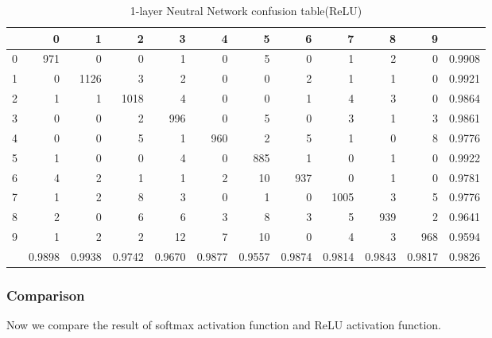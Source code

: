 \documentclass[conference]{IEEEtran}
\begin{document}
\begin{table}[htbp]
\tiny
  \centering
  \caption{1-layer Neutral Network confusion table(ReLU)}
\begin{tabular}{|r|rrrrrrrrrr|r|}
\hline
  & 0 & 1 & 2 & 3 & 4 & 5 & 6 & 7 & 8 & 9 &  \\
\hline
0 & 971 & 0 & 0 & 1 & 0 & 5 & 0 & 1 & 2 & 0 & 0.9908 \\
1 & 0 & 1126 & 3 & 2 & 0 & 0 & 2 & 1 & 1 & 0 & 0.9921 \\
2 & 1 & 1 & 1018 & 4 & 0 & 0 & 1 & 4 & 3 & 0 & 0.9864 \\
3 & 0 & 0 & 2 & 996 & 0 & 5 & 0 & 3 & 1 & 3 & 0.9861 \\
4 & 0 & 0 & 5 & 1 & 960 & 2 & 5 & 1 & 0 & 8 & 0.9776 \\
5 & 1 & 0 & 0 & 4 & 0 & 885 & 1 & 0 & 1 & 0 & 0.9922 \\
6 & 4 & 2 & 1 & 1 & 2 & 10 & 937 & 0 & 1 & 0 & 0.9781 \\
7 & 1 & 2 & 8 & 3 & 0 & 1 & 0 & 1005 & 3 & 5 & 0.9776 \\
8 & 2 & 0 & 6 & 6 & 3 & 8 & 3 & 5 & 939 & 2 & 0.9641 \\
9 & 1 & 2 & 2 & 12 & 7 & 10 & 0 & 4 & 3 & 968 & 0.9594 \\
\hline
  & 0.9898 & 0.9938 & 0.9742 & 0.9670 & 0.9877 & 0.9557 & 0.9874 & 0.9814 & 0.9843 & 0.9817 & 0.9826 \\
\hline
\end{tabular}%


  \label{1-layer Neutral Network confusion table(ReLU)}%
\end{table}%




\subsubsection{Comparison}
Now we compare the result of softmax activation function and ReLU activation function.
\end{document}
